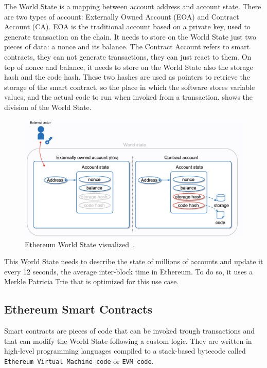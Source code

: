 The World State is a mapping between account address and account state. There are two types of account: Externally Owned Account (EOA) and Contract Account (CA). EOA is the traditional account based on a private key, used to generate transaction on the chain. It needs to store on the World State just two pieces of data: a nonce and its balance. The Contract Account refers to smart contracts, they can not generate transactions, they can just react to them. On top of nonce and balance, it needs to store on the World State also the storage hash and the code hash. These two hashes are used as pointers to retrieve the storage of the smart contract, so the place in which the software stores variable values, and the actual code to run when invoked from a transaction.  shows the division of the World State.

\begin{figure}[H]
    \centering
    \includegraphics[width=1\textwidth]{Figures/background/world-state.png}
    \caption{Ethereum World State visualized~\cite{evm-illustrated}.}
    \label{fig:ethereum-world-state}
\end{figure}

This World State needs to describe the state of millions of accounts and update it every 12 seconds, the average inter-block time in Ethereum. To do so, it uses a Merkle Patricia Trie that is optimized for this use case. 

\subsection{Ethereum Smart Contracts}

Smart contracts are pieces of code that can be invoked trough transactions and that can modify the World State following a custom logic. They are written in high-level programming languages compiled to a stack-based bytecode called {\tt Ethereum Virtual Machine code} or {\tt EVM code}. 


